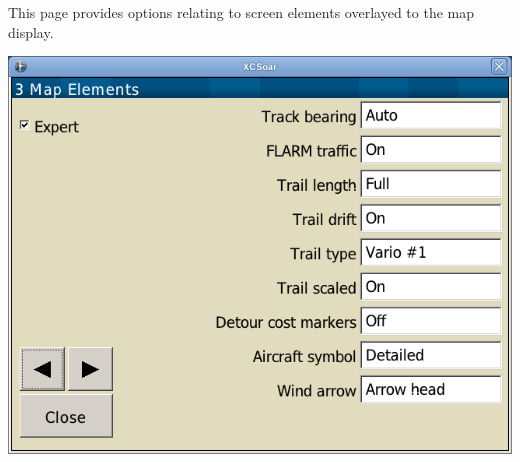 This page provides options relating to screen elements overlayed to the map display.

\begin{center}
\includegraphics[angle=0,width=0.8\linewidth,keepaspectratio='true']{figures/config-map_elements.png}
\end{center}

